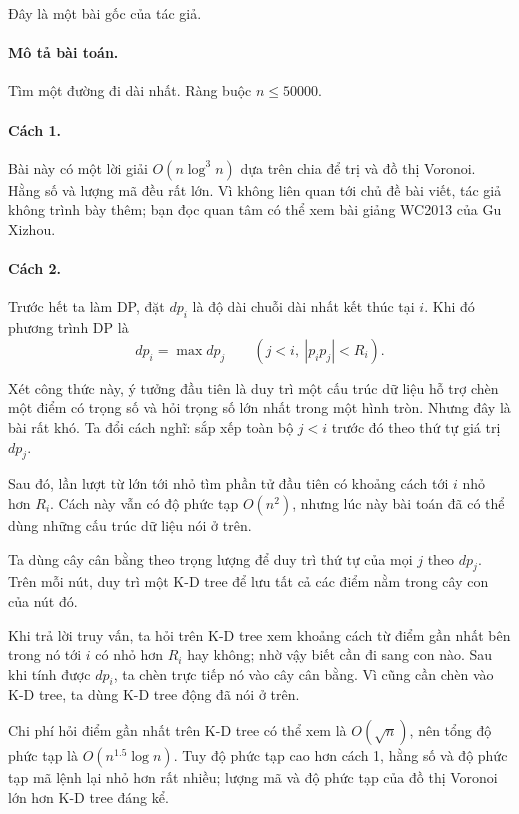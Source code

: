 \documentclass[11pt]{article}
\begin{document}
Đây là một bài gốc của tác giả.

\paragraph{Mô tả bài toán.}
Tìm một đường đi dài nhất. Ràng buộc \(n\le 50000\).

\paragraph{Cách 1.}
Bài này có một lời giải \(O(n\log^3 n)\) dựa trên chia để trị và đồ thị
Voronoi. Hằng số và lượng mã đều rất lớn. Vì không liên quan tới chủ đề bài
viết, tác giả không trình bày thêm; bạn đọc quan tâm có thể xem bài giảng
WC2013 của Gu Xizhou.

\paragraph{Cách 2.}
Trước hết ta làm DP, đặt \(dp_i\) là độ dài chuỗi dài nhất kết thúc tại
\(i\). Khi đó phương trình DP là
\[
  dp_i=\max dp_j \qquad (j<i,\ |p_i p_j|<R_i).
\]

Xét công thức này, ý tưởng đầu tiên là duy trì một cấu trúc dữ liệu hỗ trợ
chèn một điểm có trọng số và hỏi trọng số lớn nhất trong một hình tròn.
Nhưng đây là bài rất khó. Ta đổi cách nghĩ: sắp xếp toàn bộ \(j<i\) trước
đó theo thứ tự giá trị \(dp_j\).

Sau đó, lần lượt từ lớn tới nhỏ tìm phần tử đầu tiên có khoảng cách tới
\(i\) nhỏ hơn \(R_i\). Cách này vẫn có độ phức tạp \(O(n^2)\), nhưng lúc này
bài toán đã có thể dùng những cấu trúc dữ liệu nói ở trên.

Ta dùng cây cân bằng theo trọng lượng để duy trì thứ tự của mọi \(j\) theo
\(dp_j\). Trên mỗi nút, duy trì một K-D tree để lưu tất cả các điểm nằm
trong cây con của nút đó.

Khi trả lời truy vấn, ta hỏi trên K-D tree xem khoảng cách từ điểm gần nhất
bên trong nó tới \(i\) có nhỏ hơn \(R_i\) hay không; nhờ vậy biết cần đi sang
con nào. Sau khi tính được \(dp_i\), ta chèn trực tiếp nó vào cây cân bằng.
Vì cũng cần chèn vào K-D tree, ta dùng K-D tree động đã nói ở trên.

Chi phí hỏi điểm gần nhất trên K-D tree có thể xem là \(O(\sqrt n)\), nên
tổng độ phức tạp là \(O(n^{1.5}\log n)\). Tuy độ phức tạp cao hơn cách 1,
hằng số và độ phức tạp mã lệnh lại nhỏ hơn rất nhiều; lượng mã và độ phức
tạp của đồ thị Voronoi lớn hơn K-D tree đáng kể.
\end{document}
